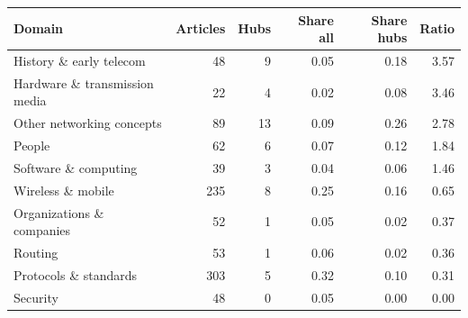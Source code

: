 
\begin{tabular}{lrrrrr}
\toprule
Domain & Articles & Hubs & Share all & Share hubs & Ratio\\
\midrule
History \& early telecom & 48 & 9 & 0.05 & 0.18 & 3.57\\
Hardware \& transmission media & 22 & 4 & 0.02 & 0.08 & 3.46\\
Other networking concepts & 89 & 13 & 0.09 & 0.26 & 2.78\\
People & 62 & 6 & 0.07 & 0.12 & 1.84\\
Software \& computing & 39 & 3 & 0.04 & 0.06 & 1.46\\
Wireless \& mobile & 235 & 8 & 0.25 & 0.16 & 0.65\\
Organizations \& companies & 52 & 1 & 0.05 & 0.02 & 0.37\\
Routing & 53 & 1 & 0.06 & 0.02 & 0.36\\
Protocols \& standards & 303 & 5 & 0.32 & 0.10 & 0.31\\
Security & 48 & 0 & 0.05 & 0.00 & 0.00\\
\bottomrule
\end{tabular}
